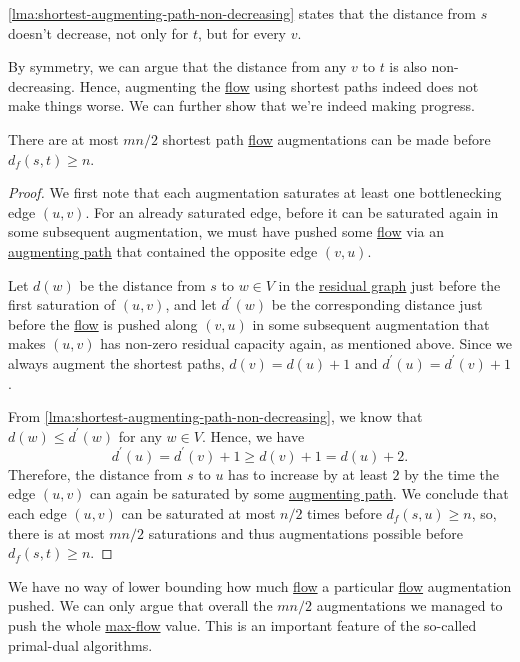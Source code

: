 \begin{note}
	\autoref{lma:shortest-augmenting-path-non-decreasing} states that the distance from \(s\) doesn't decrease, not only for \(t\), but for every \(v\).
\end{note}

By symmetry, we can argue that the distance from any \(v\) to \(t\) is also non-decreasing. Hence, augmenting the \hyperref[def:flow]{flow} using shortest paths indeed does not make things worse. We can further show that we're indeed making progress.

\begin{lemma}\label{lma:shortest-augmenting-path-progress}
	There are at most \(mn / 2\) shortest path \hyperref[def:flow]{flow} augmentations can be made before \(d_f(s, t) \geq n\).
\end{lemma}
\begin{proof}
	We first note that each augmentation saturates at least one bottlenecking edge \((u, v)\). For an already saturated edge, before it can be saturated again in some subsequent augmentation, we must have pushed some \hyperref[def:flow]{flow} via an \hyperref[def:augmenting-path]{augmenting path} that contained the opposite edge \((v, u)\).

	Let \(d(w)\) be the distance from \(s\) to \(w \in V\) in the \hyperref[def:residual-graph]{residual graph} just before the first saturation of \((u, v)\), and let \(d^{\prime} (w)\) be the corresponding distance just before the \hyperref[def:flow]{flow} is pushed along \((v, u)\) in some subsequent augmentation that makes \((u, v)\) has non-zero residual capacity again, as mentioned above. Since we always augment the shortest paths, \(d(v) = d(u) + 1\) and \(d^{\prime} (u) = d^{\prime} (v) + 1\).

	From \autoref{lma:shortest-augmenting-path-non-decreasing}, we know that \(d(w) \leq d^{\prime} (w)\) for any \(w \in V\).  Hence, we have
	\[
		d^{\prime} (u)
		= d^{\prime} (v) + 1
		\geq d(v) + 1
		= d(u) + 2.
	\]
	Therefore, the distance from \(s\) to \(u\) has to increase by at least \(2\) by the time the edge \((u, v)\) can again be saturated by some \hyperref[def:augmenting-path]{augmenting path}. We conclude that each edge \((u, v)\) can be saturated at most \(n / 2\) times before \(d_f(s, u) \geq n\), so, there is at most \(mn / 2\) saturations and thus augmentations possible before \(d_f(s, t) \geq n\).
\end{proof}

\begin{note}
	We have no way of lower bounding how much \hyperref[def:flow]{flow} a particular \hyperref[def:flow]{flow} augmentation pushed. We can only argue that overall the \(mn / 2\) augmentations we managed to push the whole \hyperref[prb:s-t-max-flow]{max-flow} value. This is an important feature of the so-called primal-dual algorithms.
\end{note}


